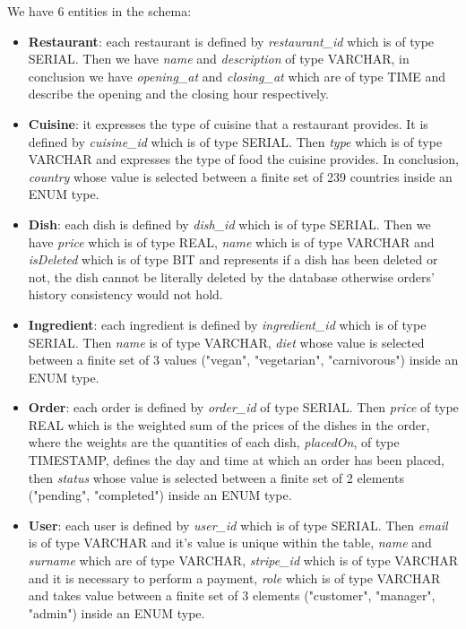 We have 6 entities in the schema:
\begin{itemize}
    \item \textbf{Restaurant}: each restaurant is defined by \textit{restaurant\_id} which is of type SERIAL. Then we have \textit{name} and \textit{description} of type VARCHAR, in conclusion we have \textit{opening\_at} and \textit{closing\_at} which are of type TIME and describe the opening and the closing hour respectively.
    
    \item \textbf{Cuisine}: it expresses the type of cuisine that a restaurant provides. It is defined by \textit{cuisine\_id} which is of type SERIAL. Then \textit{type} which is of type VARCHAR and expresses the type of food the cuisine provides. In conclusion, \textit{country} whose value is selected between a finite set of 239 countries inside an ENUM type.

    \item \textbf{Dish}: each dish is defined by \textit{dish\_id} which is of type SERIAL. Then we have \textit{price} which is of type REAL, \textit{name} which is of type VARCHAR and \textit{isDeleted} which is of type BIT and represents if a dish has been deleted or not, the dish cannot be literally deleted by the database otherwise orders' history consistency would not hold.

    \item \textbf{Ingredient}: each ingredient is defined by \textit{ingredient\_id} which is of type SERIAL. Then \textit{name} is of type VARCHAR, \textit{diet} whose value is selected between a finite set of 3 values ("vegan", "vegetarian", "carnivorous") inside an ENUM type.

    \item \textbf{Order}: each order is defined by \textit{order\_id} of type SERIAL. Then \textit{price} of type REAL which is the weighted sum of the prices of the dishes in the order, where the weights are the quantities of each dish, \textit{placedOn}, of type TIMESTAMP, defines the day and time at which an order has been placed, then \textit{status} whose value is selected between a finite set of 2 elements ("pending", "completed") inside an ENUM type.

    \item \textbf{User}: each user is defined by \textit{user\_id} which is of type SERIAL. Then \textit{email} is of type VARCHAR and it's value is unique within the table, \textit{name} and \textit{surname} which are of type VARCHAR, \textit{stripe\_id} which is of type VARCHAR and it is necessary to perform a payment, \textit{role} which is of type VARCHAR and takes value between a finite set of 3 elements ("customer", "manager", "admin") inside an ENUM type.
    
\end{itemize}
